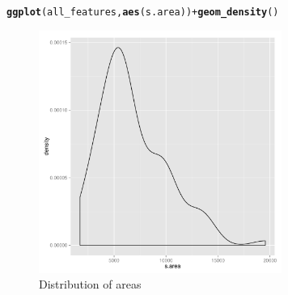 \documentclass{article}\usepackage[]{graphicx}\usepackage[]{color}
\makeatletter
\newcommand{\hlopt}[1]{\textcolor[rgb]{0,0,0}{#1}}%
\newcommand{\hlstd}[1]{\textcolor[rgb]{0.345,0.345,0.345}{#1}}%
\newcommand{\hlkwd}[1]{\textcolor[rgb]{0.737,0.353,0.396}{\textbf{#1}}}%
\newenvironment{kframe}{%
 \def\at@end@of@kframe{}%
 \ifinner\ifhmode%
  \def\at@end@of@kframe{\end{minipage}}%
  \begin{minipage}{\columnwidth}%
 \fi\fi%
 \def\FrameCommand##1{\hskip\@totalleftmargin \hskip-\fboxsep
 \colorbox{shadecolor}{##1}\hskip-\fboxsep
     \hskip-\linewidth \hskip-\@totalleftmargin \hskip\columnwidth}%
 \MakeFramed {\advance\hsize-\width
   \@totalleftmargin\z@ \linewidth\hsize
   \@setminipage}}%
 {\par\unskip\endMakeFramed%
 \at@end@of@kframe}
\newenvironment{knitrout}{}{} %
\makeatother
\begin{document}
\begin{knitrout}
\color{fgcolor}\begin{kframe}
\begin{alltt}
\hlkwd{ggplot}\hlstd{(all_features,} \hlkwd{aes}\hlstd{(s.area))} \hlopt{+} \hlkwd{geom_density}\hlstd{()}
\end{alltt}
\end{kframe}\begin{figure}[]


{\centering \includegraphics[width=300px]{knit_figure/figarea} 

}

\caption[Distribution of areas]{Distribution of areas\label{fig:area}}
\end{figure}


\end{knitrout}
\end{document}
